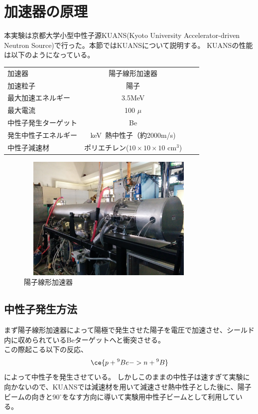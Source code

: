 
\section{加速器の原理}
本実験は京都大学小型中性子源KUANS(Kyoto University Accelerator-driven Neutron Source)で行った。本節ではKUANSについて説明する。
KUANSの性能は以下のようになっている。


\begin{table}[htb]
\centering
\begin{tabular}{lcrr}
加速器&陽子線形加速器\\
加速粒子&陽子\\
最大加速エネルギー&3.5MeV\\
最大電流&100 $\mu$ \\
中性子発生ターゲット&Be\\
発生中性子エネルギー&keV~熱中性子（約2000m/s)\\
中性子減速材&ポリエチレン($10\times10\times10$ cm$^3$)\\
\end{tabular}
\end{table}

\begin{figure}[h]
\begin{center}
\includegraphics[width=9cm,height=6cm]{accelerator/accphoto.jpg}
\caption{陽子線形加速器}
\end{center}
\end{figure}

\subsection{中性子発生方法}
まず陽子線形加速器によって陽極で発生させた陽子を電圧で加速させ、シールド内に収められているBeターゲットへと衝突させる。\\
この際起こる以下の反応、\begin{equation}
\ce{p + {^{9}Be} ->n + {^{9}B}}\end{equation}
によって中性子を発生させている。
しかしこのままの中性子は速すぎて実験に向かないので、KUANSでは減速材を用いて減速させ熱中性子とした後に、陽子ビームの向きと90$^{\circ}$をなす方向に導いて実験用中性子ビームとして利用している。
